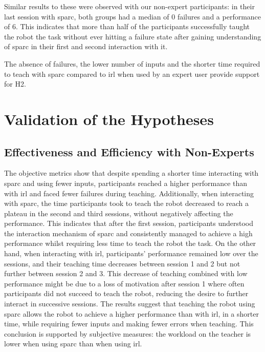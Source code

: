 Similar results to these were observed with our non-expert participants: in their last session with \gls{sparc}, both groups had a median of 0 failures and a performance of 6. This indicates that more than half of the participants successfully taught the robot the task without ever hitting a failure state after gaining understanding of \gls{sparc} in their first and second interaction with it.

The absence of failures, the lower number of inputs and the shorter time required to teach with \gls{sparc} compared to \gls{irl} when used by an expert user provide support for H2.

\section{Validation of the Hypotheses}

\subsection{Effectiveness and Efficiency with Non-Experts}
The objective metrics show that despite spending a shorter time interacting with \gls{sparc} and using fewer inputs, participants reached a higher performance than with \gls{irl} and faced fewer failures during teaching. Additionally, when interacting with \gls{sparc}, the time participants took to teach the robot decreased to reach a plateau in the second and third sessions, without negatively affecting the performance. This indicates that after the first session, participants understood the interaction mechanism of \gls{sparc} and consistently managed to achieve a high performance whilst requiring less time to teach the robot the task. On the other hand, when interacting with \gls{irl}, participants' performance remained low over the sessions, and their teaching time decreases between session 1 and 2 but not further between session 2 and 3. This decrease of teaching combined with low performance might be due to a loss of motivation after session 1 where often participants did not succeed to teach the robot, reducing the desire to further interact in successive sessions. The results suggest that teaching the robot using \gls{sparc} allows the robot to achieve a higher performance than with \gls{irl}, in a shorter time, while requiring fewer inputs and making fewer errors when teaching. This conclusion is supported by subjective measures: the workload on the teacher is lower when using \gls{sparc} than when using \gls{irl}. 

